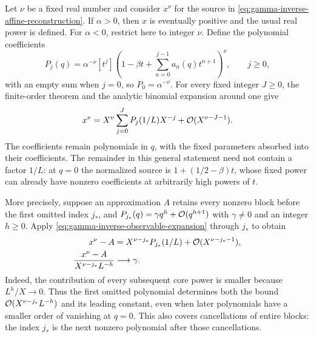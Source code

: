 Let $\nu$ be a fixed real number and consider $x^\nu$ for the source
in \eqref{eq:gamma-inverse-affine-reconstruction}. If $\alpha>0$,
then $x$ is eventually positive and the usual real power is defined.
For $\alpha<0$, restrict here to integer $\nu$. Define the polynomial
coefficients
\begin{equation}
 P_j(q)=\alpha^{-\nu}[t^j]
 \left(1-\beta t+\sum_{n=0}^{j-1}a_n(q)t^{n+1}\right)^\nu,
 \qquad j\ge0,
 \label{eq:gamma-inverse-observable-coefficients}
\end{equation}
with an empty sum when $j=0$, so $P_0=\alpha^{-\nu}$.
For every fixed integer $J\ge0$, the finite-order theorem and the
analytic binomial expansion around one give
\begin{equation}
 x^\nu=X^\nu\sum_{j=0}^{J}P_j(1/L)X^{-j}
                   +\mathcal O(X^{\nu-J-1}).
 \label{eq:gamma-inverse-observable-expansion}
\end{equation}
The coefficients remain polynomials in $q$, with the fixed parameters
absorbed into their coefficients. The remainder in this general
statement need not contain a factor $1/L$: at $q=0$ the normalized
source is $1+(1/2-\beta)t$, whose fixed power can already have
nonzero coefficients at arbitrarily high powers of $t$.

More precisely, suppose an approximation $A$ retains every nonzero
block before the first omitted index $j_*$, and
$P_{j_*}(q)=\gamma q^h+\mathcal O(q^{h+1})$ with $\gamma\ne0$ and
an integer $h\ge0$. Apply
\eqref{eq:gamma-inverse-observable-expansion} through $j_*$ to obtain
\begin{align}
 x^\nu-A
   &=X^{\nu-j_*}P_{j_*}(1/L)+\mathcal O(X^{\nu-j_*-1}),\notag\\
 \frac{x^\nu-A}{X^{\nu-j_*}L^{-h}}&\longrightarrow\gamma.
 \label{eq:gamma-inverse-observable-first-omitted}
\end{align}
Indeed, the contribution of every subsequent core power is smaller
because $L^h/X\to0$. Thus the first omitted polynomial determines
both the bound $\mathcal O(X^{\nu-j_*}L^{-h})$ and its leading constant,
even when later polynomials have a smaller order of vanishing at
$q=0$. This also covers cancellations of entire blocks: the index
$j_*$ is the next nonzero polynomial after those cancellations.
